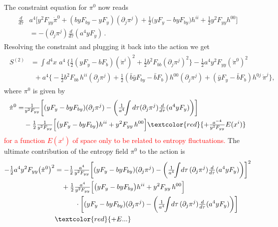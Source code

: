 The constraint equation for $\pi^0$ now reads
{\small\begin{align}
\begin{aligned}
    \frac{d}{d\tau}&a^4\bigg[y^2F_{yy}\dot{\pi}^0+(byF_{by}-yF_y) (\partial_j\pi^j)+\tfrac12\!\big({y}F_y - byF_{by}\big) h^{ii}
    + \tfrac12 y^2 F_{yy} h^{00}\bigg]
    \\
    &=-(\partial_j \pi^j)\tfrac{d}{d\tau}(a^4yF_y)\,.
\end{aligned}
\end{align}}
Resolving the constraint and plugging it back into the action we get
{\small\begin{align}
\begin{aligned}
    S^{(2)}&=
    \int d^4x\,\, a^4\,\bigg\{
    \tfrac12 (yF_y-bF_b) (\dot{\pi}^i)^2+ \tfrac12 b^2 F_{bb} (\partial_j \pi^j)^2\bigg\} -\tfrac12 a^4 y^2F_{yy} (\dot{\pi}^0)^2\\
    & \,\,\,+ a^4\bigg\{-\tfrac12 b^2 F_{bb}\, h^{ii}(\partial_j \pi^j)
    + \tfrac12\!\left(\bar{b}\bar{y}F_{by}-\bar{b}F_b\right) h^{00}(\partial_j \pi^j)+\left(\bar{y}F_y - \bar{b}F_b\right) h^{0j}\,\dot{\pi}^j \bigg\},
\end{aligned}
\end{align}}
where $\pi^0$ is given by
{\small
\begin{align}
\begin{aligned}
    \dot{\pi}^0
    =&\tfrac{1}{y^2F_{yy}}\bigg[(yF_y-byF_{by}) (\partial_j\pi^j)-\bigg(\tfrac{1}{a^4}\!\!\int d\tau(\partial_j \pi^j)\tfrac{d}{d\tau}(a^4yF_y)\bigg)\bigg]\\
    &-\tfrac12 \tfrac{1}{y^2F_{yy}}\Big[\big({y}F_y - byF_{by}\big) h^{ii}+ y^2 F_{yy}\, h^{00}\Big] \textcolor{red}{+\tfrac{a^{-4}}{y^2F_{yy}}E(x^i)}
\end{aligned}
\end{align}}
\textcolor{red}{for a function $E(x^i)$ of space only to be related to entropy fluctuations.}
The ultimate contribution of the entropy field $\pi^0$ to the action is
{\small
\begin{align}
\begin{aligned}
    -\tfrac12 a^4y^2F_{yy}\big(\dot{\pi}^0\big)^2
    &=-\tfrac{1}{2}\tfrac{a^4}{y^2F_{yy}}\bigg[(yF_y-byF_{by}) (\partial_j\pi^j)-\bigg(\tfrac{1}{a^4}\!\!\int\! d\tau\,(\partial_j \pi^j)\tfrac{d}{d\tau}(a^4yF_y)\bigg)\bigg]^2\\
    &\quad+\tfrac12 \tfrac{a^4}{y^2F_{yy}}\Big[\big({y}F_y - byF_{by}\big) h^{ii}+ y^2 F_{yy}\, h^{00}\Big]\\
    &\quad\qquad\cdot \bigg[(yF_y-byF_{by}) (\partial_j\pi^j)-\bigg(\tfrac{1}{a^4}\!\!\int\! d\tau\,(\partial_j \pi^j)\tfrac{d}{d\tau}(a^4yF_y)\bigg)\bigg]\,
    \\
    &\textcolor{red}{+E...}
\end{aligned}
\end{align}}
